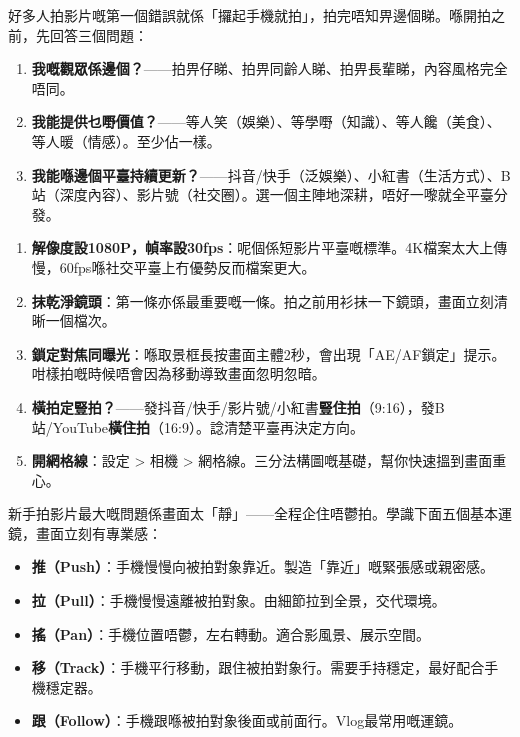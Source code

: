 


好多人拍影片嘅第一個錯誤就係「攞起手機就拍」，拍完唔知畀邊個睇。喺開拍之前，先回答三個問題：

\begin{enumerate}
  \item \textbf{我嘅觀眾係邊個？}——拍畀仔睇、拍畀同齡人睇、拍畀長輩睇，內容風格完全唔同。
  \item \textbf{我能提供乜嘢價值？}——等人笑（娛樂）、等學嘢（知識）、等人饞（美食）、等人暖（情感）。至少佔一樣。
  \item \textbf{我能喺邊個平臺持續更新？}——抖音/快手（泛娛樂）、小紅書（生活方式）、B站（深度內容）、影片號（社交圈）。選一個主陣地深耕，唔好一嚟就全平臺分發。
\end{enumerate}


\begin{enumerate}
  \item \textbf{解像度設1080P，幀率設30fps}：呢個係短影片平臺嘅標準。4K檔案太大上傳慢，60fps喺社交平臺上冇優勢反而檔案更大。
  \item \textbf{抹乾淨鏡頭}：第一條亦係最重要嘅一條。拍之前用衫抹一下鏡頭，畫面立刻清晰一個檔次。
  \item \textbf{鎖定對焦同曝光}：喺取景框長按畫面主體2秒，會出現「AE/AF鎖定」提示。咁樣拍嘅時候唔會因為移動導致畫面忽明忽暗。
  \item \textbf{橫拍定豎拍？}——發抖音/快手/影片號/小紅書\textbf{豎住拍}（9:16），發B站/YouTube\textbf{橫住拍}（16:9）。諗清楚平臺再決定方向。
  \item \textbf{開網格線}：設定 > 相機 > 網格線。三分法構圖嘅基礎，幫你快速搵到畫面重心。
\end{enumerate}


新手拍影片最大嘅問題係畫面太「靜」——全程企住唔鬱拍。學識下面五個基本運鏡，畫面立刻有專業感：

\begin{itemize}
  \item \textbf{推（Push）}：手機慢慢向被拍對象靠近。製造「靠近」嘅緊張感或親密感。
  \item \textbf{拉（Pull）}：手機慢慢遠離被拍對象。由細節拉到全景，交代環境。
  \item \textbf{搖（Pan）}：手機位置唔鬱，左右轉動。適合影風景、展示空間。
  \item \textbf{移（Track）}：手機平行移動，跟住被拍對象行。需要手持穩定，最好配合手機穩定器。
  \item \textbf{跟（Follow）}：手機跟喺被拍對象後面或前面行。Vlog最常用嘅運鏡。
\end{itemize}

